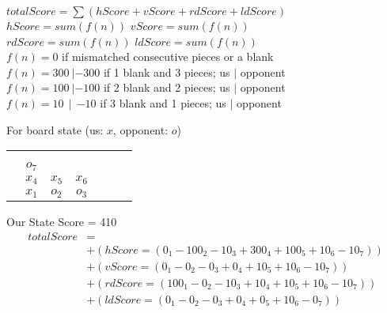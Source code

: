 \documentclass[11pt]{article}  %
\begin{document}
$totalScore = \sum(hScore + vScore + rdScore + ldScore)$\\
$hScore = sum(f(n))$ \quad $vScore = sum(f(n))$\\
$rdScore = sum(f(n))$ \quad $ldScore = sum(f(n))$\\
$f(n) = 0$ if mismatched consecutive pieces or a blank\\
$f(n) = 300\ | {-300}$ if 1 blank and 3 pieces; us $|$ opponent\\
$f(n) = 100\ | {-100}$ if 2 blank and 2 pieces; us $|$ opponent\\
$f(n) = 10\ \ |\ \ {-10}$ if 3 blank and 1 pieces; us $|$ opponent\\
\begin{center}
For board state (us: $x$, opponent: $o$)\\
\begin{tabular}{|c|c|c|c|c|c|c|}
\hline
&  &  &  &  &  &\\
\hline
&  &  &  &  &  &\\
\hline
&  &  &  &  &  &\\
\hline
& $o_7$ &  &  &  &  &\\
\hline
& $x_4$ & $x_5$ & $x_6$ &  &  &\\
\hline
& $x_1$ & $o_2$ & $o_3$ &  &  &\\
\hline  
\end{tabular}

Our State Score = 410
\begin{align*}
totalScore &=\\
&+ (hScore = (0_1 - 100_2 - 10_3 + 300_4 + 100_5 + 10_6 - 10_7))\\
&+ (vScore = (0_1 - 0_2 - 0_3 + 0_4 + 10_5 + 10_6 - 10_7))\\
&+ (rdScore = (100_1 - 0_2 - 10_3 + 10_4 + 10_5 + 10_6 -10_7))\\
&+ (ldScore = (0_1 - 0_2 - 0_3 + 0_4 + 0_5 + 10_6 - 0_7))\\
\end{align*}
\end{center}
\end{document}
